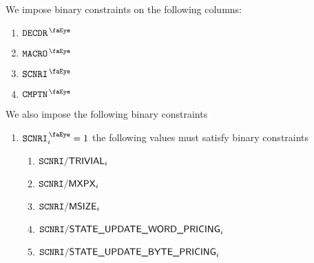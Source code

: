 We impose binary constraints on the following columns:
\begin{multicols}{4}
	\begin{enumerate}
		\item $\isMxpInstructionDecoder$
		\item $\isMxpMacro             $
		\item $\isMxpScenario          $
		\item $\isMxpComputation       $
	\end{enumerate}
\end{multicols}

We also impose the following binary constraints
\begin{enumerate}
	\item \If $\isMxpScenario _{i} = 1$ \Then the following values must satisfy binary constraints
		\begin{enumerate}
			\item $\texttt{SCNRI}\textsf{/}{\textsf{TRIVIAL}}       _{i}$
			\item $\texttt{SCNRI}\textsf{/}{\textsf{MXPX}}                   _{i}$
			\item $\texttt{SCNRI}\textsf{/}{\textsf{MSIZE}}                  _{i}$
			\item $\texttt{SCNRI}\textsf{/}{\textsf{STATE\_UPDATE\_WORD\_PRICING}} _{i}$
			\item $\texttt{SCNRI}\textsf{/}{\textsf{STATE\_UPDATE\_BYTE\_PRICING}} _{i}$
		\end{enumerate}
\end{enumerate}
